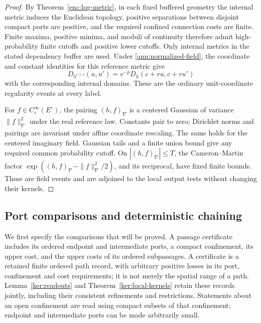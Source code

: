 \begin{proof}
By Theorem~\ref{enc:lqg-metric}, in each fixed buffered geometry
the internal metric induces the Euclidean topology, positive
separations between disjoint compact ports are positive, and the
required confined connection costs are finite.  Finite maxima,
positive minima, and moduli of continuity therefore admit
high-probability finite cutoffs and positive lower cutoffs.
Only internal metrics in the stated dependency buffer are used.
Under \eqref{ann:normalized-field}, the coordinate and constant
identities for this reference metric give
\[
 D_{h^{c,r,v}}(u,u')
       =v^{-p}D_h(c+ru,c+ru')
\]
with the corresponding internal domains.  These are the ordinary
unit-coordinate regularity events at every label.

For \(f\in C_c^\infty(E^\circ)\), the pairing
\((h,f)_\nabla\) is a centered Gaussian of variance
\(\|f\|_\nabla^2\) under the real reference law.  Constants pair
to zero; Dirichlet norms and pairings are invariant under affine
coordinate rescaling.  The same holds for the centered imaginary
field.  Gaussian tails and a finite union bound give any required
common probability cutoff.  On \(|(h,f)_\nabla|\le T\), the
Cameron--Martin factor
\(\exp((h,f)_\nabla-\|f\|_\nabla^2/2)\), and its reciprocal,
have fixed finite bounds.  These are field events and are adjoined
to the local output tests without changing their kernels.
\end{proof}


\subsection{Port comparisons and deterministic chaining}

We first specify the comparisons that will be proved.  A passage
certificate includes its ordered endpoint and intermediate ports, a
compact confinement, its upper cost, and the upper costs of its ordered
subpassages.  A certificate is a retained finite ordered path record, with arbitrary
positive losses in its port, confinement and cost requirements; it is
not merely the spatial range of a path.  Lemma~\ref{ker:readouts} and
Theorem~\ref{ker:local-kernels} retain these records jointly, including
their consistent refinements and restrictions.  Statements about
an open confinement are read using compact subsets of that confinement;
endpoint and intermediate ports can be made arbitrarily small.

